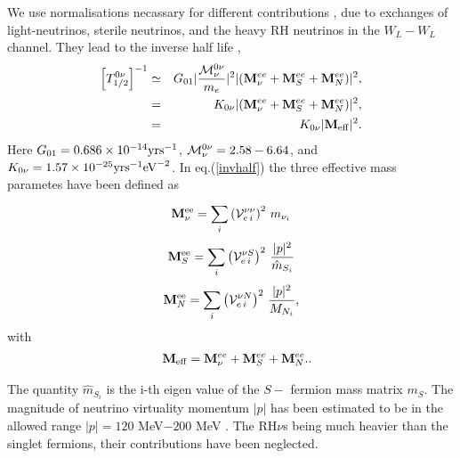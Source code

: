 \documentclass[a4paper,11pt]{article}
\newcommand{\bea}{\begin{eqnarray}}
\newcommand{\eea}{\end{eqnarray}}
\begin{document}
We use normalisations necassary for different contributions \cite{Vergados,Doi},  due to exchanges of
 light-neutrinos, sterile neutrinos, and the heavy
RH neutrinos  in the $W_L-W_L$ channel. They 
lead to the inverse half life \cite{app:2013,pas:2014,bpn-mkp:2015},   
\begin{eqnarray}
  \left[T_{1/2}^{0\nu}\right]^{-1} &\simeq &
  G_{01}|\frac{{\cal M}^{0\nu}_\nu}{m_e}|^2|({\large\bf
    M}^{ee}_{\nu} +{\large\bf M}^{ee}_{S}+{\large\bf M}^{ee}_{N})|^2,\nonumber\\
&=& K_{0\nu}|({\large\bf
    M}^{ee}_{\nu} +{\large\bf M}^{ee}_{S}+{\large\bf M}^{ee}_{N})|^2,\nonumber\\
&=& K_{0\nu}|{\large\bf
    M}_{\rm eff} |^2.
  \label{invhalf}
\end{eqnarray}
Here  $G_{01}= 0.686\times 10^{-14} {\rm yrs}^{-1}$, ${\cal
  M}^{0\nu}_{\nu} = 2.58-6.64$, and $K_{0\nu}= 1.57\times 10^{-25} {\rm yrs}^{-1}
{\rm eV}^{-2}$. In eq.(\ref{invhalf}) the three effective mass parametes  have been defined as 
\begin{eqnarray}
{\large \bf  M}^{\rm ee}_{\nu} =\sum^{}_{i} \left(\mathcal{V}^{\nu \nu}_{e\,i}\right)^2\, {m_{\nu_i}}
\label{effmassparanus} 
\end{eqnarray}
\bea
{\large \bf  M}^{\rm ee}_{S} = \sum^{}_{i} \left(\mathcal{V}^{\nu
  S}_{e\,i}\right)^2\, \frac{|p|^2}{{\hat m}_{S_i}} 
  \label{effmassparanus2} 
\eea
\begin{eqnarray}
{\large \bf  M}^{\rm ee}_{N} = \sum^{}_{i} \left(\mathcal{V}^{\nu
  N}_{e\,i}\right)^2\, \frac{|p|^2}{M_{N_i}},
\label{effmassparanus3} 
\end{eqnarray}
with 
\begin{eqnarray}
&&{\large\bf M}_{\rm eff}={\large\bf M}^{ee}_{\nu} +{\large\bf
    M}^{ee}_{S}+{\large\bf M}^{ee}_{N}.\label{sumeff}.
\end{eqnarray}

The quantity ${\hat m}_{S_i}$ is the i-th eigen value of the  $S-$ fermion mass matrix
$m_S$. The magnitude of neutrino virtuality momentum $|p|$ has been estimated to be in the allowed range 
$|p|= 120$ MeV$-200$ MeV \cite{Vergados,Doi}.
The RH$\nu$s being much heavier than the singlet fermions, their
contributions have been neglected. 
\end{document}

